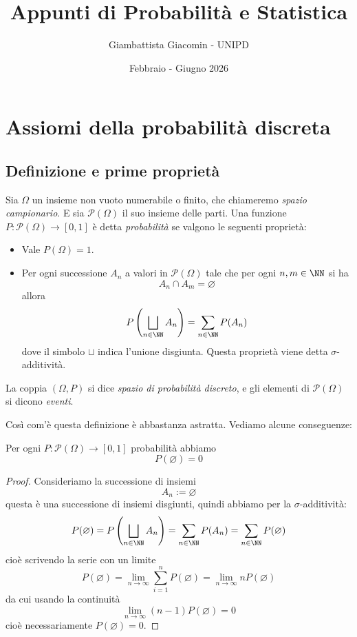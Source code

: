 \documentclass[11pt]{scrartcl}
\newcommand{\parti}[1]{\mathcal{P}\!\left(#1\right)}
\newcommand{\eset}{\varnothing}
\begin{document}
	\title{Appunti di Probabilità e Statistica}
	\subtitle{Giambattista Giacomin - UNIPD}
	\date{Febbraio - Giugno 2026}
	
	
	\maketitle
	
	\tableofcontents
	
	\newpage
	
	\section{Assiomi della probabilità discreta}
	\subsection{Definizione e prime proprietà}
	\begin{definition}
		Sia $\Omega$ un insieme non vuoto numerabile o finito, che chiameremo \textit{spazio campionario}. E sia $\parti{\Omega}$ il suo insieme delle parti. Una funzione $P:\parti{\Omega}\to [0,1]$ è detta \textit{probabilità} se valgono le seguenti proprietà:
		\begin{itemize}
			\item Vale $P(\Omega)=1$.
			\item Per ogni successione $A_n$ a valori in $\parti{\Omega}$ tale che per ogni $n,m\in\NN$ si ha
			$$A_n\cap A_m = \eset$$
			allora 
			$$P\left(\bigsqcup_{n\in\NN}A_n\right)=\sum_{n\in\NN}P(A_n)$$
			dove il simbolo $\sqcup$ indica l'unione disgiunta. Questa proprietà viene detta $\sigma$-additività.
		\end{itemize}
		La coppia $(\Omega,P)$ si dice \textit{spazio di probabilità discreto}, e gli elementi di $\parti{\Omega}$ si dicono \textit{eventi}.
	\end{definition}
	Così com'è questa definizione è abbastanza astratta. Vediamo alcune conseguenze:
	\begin{proposition}
		Per ogni $P:\parti{\Omega}\to [0,1]$ probabilità abbiamo 
		$$P(\eset)=0$$
	\end{proposition}
	\begin{proof}
		Consideriamo la successione di insiemi
		$$A_n:=\eset$$
		questa è una successione di insiemi disgiunti, quindi abbiamo per la $\sigma$-additività:
		$$P(\eset)=P\left(\bigsqcup_{n\in\NN}A_n\right)=\sum_{n\in\NN}P(A_n)=\sum_{n\in\NN}P(\eset)$$
		cioè scrivendo la serie con un limite
		$$P(\eset)=\lim_{n\to\infty}\sum_{i=1}^{n}P(\eset)=\lim_{n\to \infty}nP(\eset)$$
		da cui usando la continuità
		$$\lim_{n\to\infty}(n-1)P(\eset)=0$$
		cioè necessariamente $P(\eset)=0$.
	\end{proof}
\end{document}
